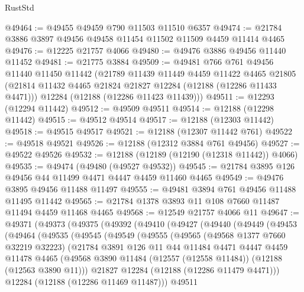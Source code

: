 \begin{lexlean}{RustStd}
\begin{coremodule}
@49464 := @49455 @49459 @790 @11503 @11510 @6357
@49474 := @21784 @3886 @3897 @49456 @49458 @11454 @11502 @11509 @4459 @11414 @4465
@49476 := @12225 @21757 @4066
@49480 := @49476 @3886 @49456 @11440 @11452
@49481 := @21775 @3884
@49509 := @49481
    @766
    @761
    @49456
    @11440
    @11450
    @11442
    (@21789
      @11439
      @11449
      @4459
      @11422
      @4465
      @21805
      (@21814 @11432 @4465 @21824 @21827 @12284 (@12188 (@12286 @11433 @4471)))
      @12284
      (@12188 (@12286 @11423 @11439)))
@49511 := @12293 (@12294 @11442)
@49512 := @49509 @49511
@49514 := @12188 (@12298 @11442)
@49515 := @49512 @49514
@49517 := @12188 (@12303 @11442)
@49518 := @49515 @49517
@49521 := @12188 (@12307 @11442 @761)
@49522 := @49518 @49521
@49526 := @12188 (@12312 @3884 @761 @49456)
@49527 := @49522 @49526
@49532 := @12188 (@12189 (@12190 (@12318 @11442)) @4066)
@49535 := @49474 (@49480 (@49527 @49532))
@49545 := @21784 @3895 @126 @49456 @44 @11499 @4471 @4447 @4459 @11460 @4465
@49549 := @49476 @3895 @49456 @11488 @11497
@49555 := @49481 @3894 @761 @49456 @11488 @11495 @11442
@49565 := @21784 @1378 @3893 @11 @108 @7660 @11487 @11494 @4459 @11468 @4465
@49568 := @12549 @21757 @4066 @11
@49647 := @49371
    (@49373
      (@49375
        (@49392
          (@49410
            (@49427
              (@49440
                (@49449
                  (@49453
                    (@49464
                      (@49535
                        (@49545
                          (@49549
                            (@49555
                              (@49565
                                (@49568 @1377 @7660 @32219 @32223)
                                (@21784
                                  @3891
                                  @126
                                  @11
                                  @44
                                  @11484
                                  @4471
                                  @4447
                                  @4459
                                  @11478
                                  @4465
                                  (@49568
                                    @3890
                                    @11484
                                    (@12557 (@12558 @11484))
                                    (@12188 (@12563 @3890 @11)))
                                  @21827
                                  @12284
                                  (@12188 (@12286 @11479 @4471)))
                                @12284
                                (@12188 (@12286 @11469 @11487)))
                              @49511

\end{coremodule}
\end{lexlean}
